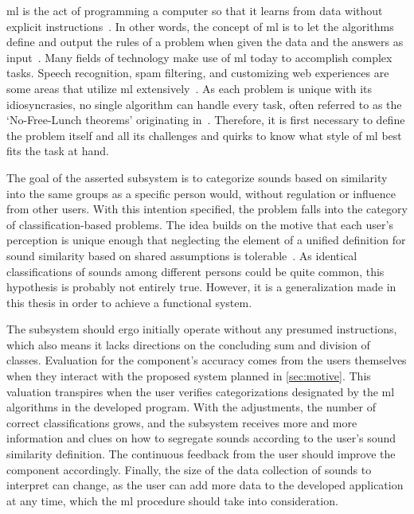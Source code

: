 \Acrlong{ml} is the act of programming a computer so that it learns from data without explicit instructions~\cite[26]{book:hands-on_machine_learning_with_scikit-learn_&_tensorflow}. In other words, the concept of \acrlong{ml} is to let the algorithms define and output the rules of a problem when given the data and the answers as input~\cite[28]{book:deep_learning_with_python}. Many fields of technology make use of \gls{ml} today to accomplish complex tasks. Speech recognition, spam filtering, and customizing web experiences are some areas that utilize \gls{ml} extensively~\cite[13]{book:hands-on_machine_learning_with_scikit-learn_&_tensorflow}. As each problem is unique with its idiosyncrasies, no single algorithm can handle every task, often referred to as the `No-Free-Lunch theorems' originating in~\cite[12]{rep:the_lack_of_a_priori_distinctions_between_learning_algorithms}. Therefore, it is first necessary to define the problem itself and all its challenges and quirks to know what style of \gls{ml} best fits the task at hand.

The goal of the asserted subsystem is to categorize sounds based on similarity into the same groups as a specific person would, without regulation or influence from other users. With this intention specified, the problem falls into the category of classification-based problems. The idea builds on the motive that each user's perception is unique enough that neglecting the element of a unified definition for sound similarity based on shared assumptions is tolerable~\cite[2]{rep:psychoacoustically_informed_spectrography_and_timbre}. As identical classifications of sounds among different persons could be quite common, this hypothesis is probably not entirely true. However, it is a generalization made in this thesis in order to achieve a functional system.

The subsystem should ergo initially operate without any presumed instructions, which also means it lacks directions on the concluding sum and division of classes. Evaluation for the component's accuracy comes from the users themselves when they interact with the proposed system planned in \cref{sec:motive}. This valuation transpires when the user verifies categorizations designated by the \gls{ml} algorithms in the developed program. With the adjustments, the number of correct classifications grows, and the subsystem receives more and more information and clues on how to segregate sounds according to the user's sound similarity definition. The continuous feedback from the user should improve the component accordingly. Finally, the size of the data collection of sounds to interpret can change, as the user can add more data to the developed application at any time, which the \gls{ml} procedure should take into consideration.

